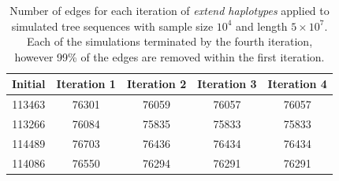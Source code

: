 \documentclass[10pt,twoside,lineno]{gsajnl}
\begin{document}
\begin{table}[!hbt]
\begin{center}
\begin{tabular}{|c|c|c|c|c|}
	\hline
	Initial & Iteration 1 & Iteration 2 & Iteration 3 & Iteration 4 \\
	\hline
	\hline
	113463	&	76301	&	76059	&	76057	&	76057 \\
	\hline
	113266 & 76084	&	75835	&	75833	&	75833 \\
	\hline
	114489 & 76703 & 76436 & 76434 & 76434 \\
	\hline
	114086	& 76550	& 76294	& 76291	& 76291\\
	\hline
\end{tabular}
\caption{Number of edges for each iteration of \textit{extend haplotypes} applied to 
simulated tree sequences with sample size $10^4$ and length $5\times 10^7$. 
Each of the simulations terminated by the fourth iteration, however 99\% of the edges
are removed within the first iteration.}
\label{tab:edge-counts}
\end{center}
\end{table}
\end{document}
